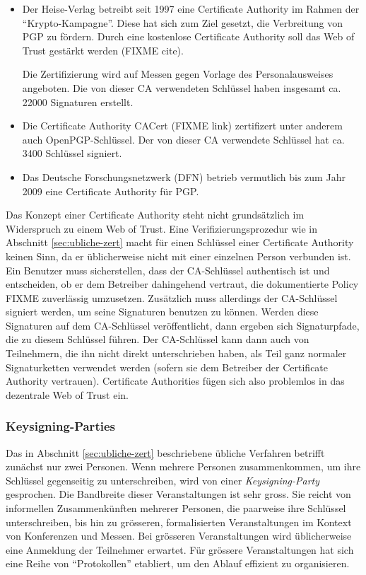 \begin{itemize}
\item Der Heise-Verlag betreibt seit 1997 eine Certificate Authority
  im Rahmen der ``Krypto-Kampagne''. Diese hat sich zum Ziel gesetzt,
  die Verbreitung von PGP zu f\"ordern. Durch eine kostenlose
  Certificate Authority soll das Web of Trust gest\"arkt werden (FIXME
  cite).

  Die Zertifizierung wird auf Messen gegen Vorlage des
  Personalausweises angeboten. Die von dieser CA verwendeten
  Schl\"ussel haben insgesamt ca. 22000 Signaturen erstellt.
\item Die Certificate Authority CACert (FIXME link) zertifizert unter
  anderem auch OpenPGP-Schl\"ussel. Der von dieser CA verwendete
  Schl\"ussel hat ca. 3400 Schl\"ussel signiert.
\item Das Deutsche Forschungsnetzwerk (DFN) betrieb vermutlich bis zum
  Jahr 2009 eine Certificate Authority f\"ur PGP.
\end{itemize}

Das Konzept einer Certificate Authority steht nicht grunds\"atzlich im
Widerspruch zu einem Web of Trust. Eine Verifizierungsprozedur wie in
Abschnitt \ref{sec:ubliche-zert} macht f\"ur einen Schl\"ussel einer
Certificate Authority keinen Sinn, da er \"ublicherweise nicht mit
einer einzelnen Person verbunden ist. Ein Benutzer muss sicherstellen,
dass der CA-Schl\"ussel authentisch ist und entscheiden, ob er dem
Betreiber dahingehend vertraut, die dokumentierte Policy FIXME
zuverl\"assig umzusetzen. Zus\"atzlich muss allerdings der
CA-Schl\"ussel signiert werden, um seine Signaturen benutzen zu
k\"onnen. Werden diese Signaturen auf dem CA-Schl\"ussel
ver\"offentlicht, dann ergeben sich Signaturpfade, die zu diesem
Schl\"ussel f\"uhren. Der CA-Schl\"ussel kann dann auch von
Teilnehmern, die ihn nicht direkt unterschrieben haben, als Teil ganz
normaler Signaturketten verwendet werden (sofern sie dem Betreiber der
Certificate Authority vertrauen). Certificate Authorities f\"ugen sich
also problemlos in das dezentrale Web of Trust ein.

\subsubsection{Keysigning-Parties}
\label{sec:keysigning-parties}

Das in Abschnitt \ref{sec:ubliche-zert} beschriebene \"ubliche
Verfahren betrifft zun\"achst nur zwei Personen. Wenn mehrere Personen
zusammenkommen, um ihre Schl\"ussel gegenseitig zu unterschreiben,
wird von einer \emph{Keysigning-Party} gesprochen. Die Bandbreite
dieser Veranstaltungen ist sehr gross. Sie reicht von informellen
Zusammenk\"unften mehrerer Personen, die paarweise ihre Schl\"ussel
unterschreiben, bis hin zu gr\"osseren, formalisierten Veranstaltungen
im Kontext von Konferenzen und Messen. Bei gr\"osseren Veranstaltungen
wird \"ublicherweise eine Anmeldung der Teilnehmer erwartet. F\"ur
gr\"ossere Veranstaltungen hat sich eine Reihe von ``Protokollen''
etabliert, um den Ablauf effizient zu organisieren\cite{Brennen2008}.


